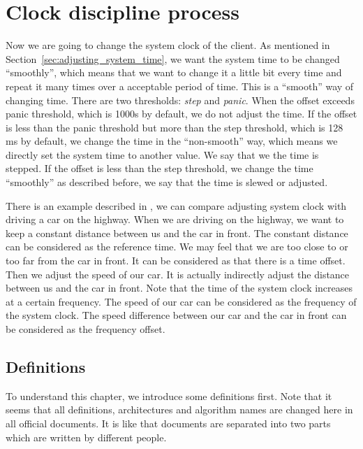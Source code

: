 

\chapter{Clock discipline process}%
\label{cha:clock_discipline_process}
Now we are going to change the system clock of the client. As mentioned in 
Section~\ref{sec:adjusting_system_time}, we want the system time to be changed
``smoothly'', which means that we want to change it a little bit every time and 
repeat it many times over a acceptable period of time. This is a ``smooth'' way
of changing time. There are two thresholds: \emph{step} and \emph{panic}. When
the offset exceeds panic threshold, which is 1000s by default, we do not adjust
the time. If the offset is less than the panic threshold but more than the step
threshold, which is 128 ms by default, we change the time in the ``non-smooth''
way, which means we directly set the system time to another value. We say that
we the time is stepped. If the offset is less than the step threshold, we
change the time ``smoothly'' as described before, we say that the time is
slewed or adjusted.

There is an example described in \cite{redbook}, we can compare adjusting
system clock with driving a car on the highway. When we are driving on the
highway, we want to keep a constant distance between us and the car in front.
The constant distance can be considered as the reference time. We may feel that
we are too close to or too far from the car in front. It can be considered as
that there is a time offset. Then we adjust the speed of our car. It is
actually indirectly adjust the distance between us and the car in front. Note
that the time of the system clock increases at a certain frequency. The speed
of our car can be considered as the frequency of the system clock. The speed
difference between our car and the car in front can be considered as the
frequency offset.

\section{Definitions}%
\label{sec:clock_discipline_concepts}
To understand this chapter, we introduce some definitions first. Note that it
seems that all definitions, architectures and algorithm names are changed here in
all official documents. It is like that documents are separated into two parts
which are written by different people.


